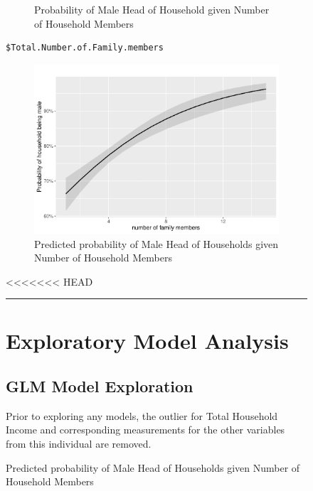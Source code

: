 \documentclass[
]{article}
\begin{document}
\begin{figure}[H]
\begin{figure}[H]
{}

\caption{Probability of Male Head of Household given Number of Household Members}\label{fig:probability plot}
\end{figure}

\begin{verbatim}
$Total.Number.of.Family.members
\end{verbatim}

\begin{figure}[H]

{\centering \includegraphics[width=0.8\linewidth]{Group_01_Project2_demo_files/figure-latex/probability plot 2-1} 

}

\caption{Predicted probability of Male Head of Households given Number of Household Members}\label{fig:probability plot 2}
\end{figure}

<<<<<<< HEAD
\begin{center}\rule{0.5\linewidth}{0.5pt}\end{center}

\newpage

\hypertarget{sec:EMA}{%
\section{Exploratory Model Analysis}\label{sec:EMA}}

\hypertarget{glm-model-exploration}{%
\subsection{GLM Model Exploration}\label{glm-model-exploration}}

Prior to exploring any models, the outlier for Total Household Income
and corresponding measurements for the other variables from this
individual are removed.


\end{figure}
\end{document}
